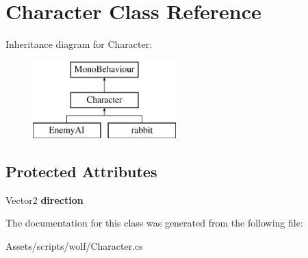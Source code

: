 \hypertarget{class_character}{}\section{Character Class Reference}
\label{class_character}
Inheritance diagram for Character\+:\begin{figure}[H]
\begin{center}
\leavevmode
\includegraphics[height=3.000000cm]{class_character}
\end{center}
\end{figure}
\subsection*{Protected Attributes}
\begin{DoxyCompactItemize}
\item 
\mbox{\label{class_character_aa86b30af2dd95e4208c38bd0810faac0}} 
Vector2 {\bfseries direction}
\end{DoxyCompactItemize}


The documentation for this class was generated from the following file\+:\begin{DoxyCompactItemize}
\item 
Assets/scripts/wolf/Character.\+cs\end{DoxyCompactItemize}
